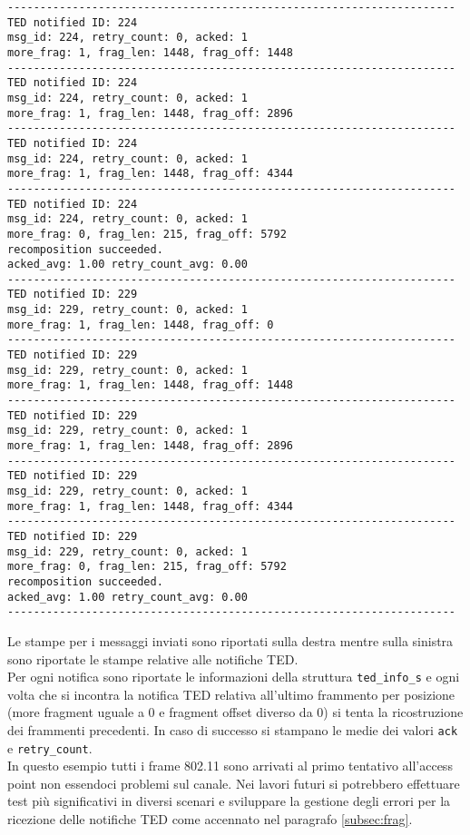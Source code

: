 \documentclass[a4paper,10pt]{article}
\begin{document}
\begin{lstlisting}
---------------------------------------------------------------------
TED notified ID: 224 
msg_id: 224, retry_count: 0, acked: 1
more_frag: 1, frag_len: 1448, frag_off: 1448
---------------------------------------------------------------------
TED notified ID: 224 
msg_id: 224, retry_count: 0, acked: 1
more_frag: 1, frag_len: 1448, frag_off: 2896
---------------------------------------------------------------------
TED notified ID: 224 
msg_id: 224, retry_count: 0, acked: 1
more_frag: 1, frag_len: 1448, frag_off: 4344
---------------------------------------------------------------------
TED notified ID: 224 
msg_id: 224, retry_count: 0, acked: 1
more_frag: 0, frag_len: 215, frag_off: 5792
recomposition succeeded.
acked_avg: 1.00 retry_count_avg: 0.00
---------------------------------------------------------------------
TED notified ID: 229 
msg_id: 229, retry_count: 0, acked: 1
more_frag: 1, frag_len: 1448, frag_off: 0
---------------------------------------------------------------------
TED notified ID: 229 
msg_id: 229, retry_count: 0, acked: 1
more_frag: 1, frag_len: 1448, frag_off: 1448
---------------------------------------------------------------------
TED notified ID: 229 
msg_id: 229, retry_count: 0, acked: 1
more_frag: 1, frag_len: 1448, frag_off: 2896
---------------------------------------------------------------------
TED notified ID: 229 
msg_id: 229, retry_count: 0, acked: 1
more_frag: 1, frag_len: 1448, frag_off: 4344
---------------------------------------------------------------------
TED notified ID: 229 
msg_id: 229, retry_count: 0, acked: 1
more_frag: 0, frag_len: 215, frag_off: 5792
recomposition succeeded.
acked_avg: 1.00 retry_count_avg: 0.00
---------------------------------------------------------------------

\end{lstlisting}

Le stampe per i messaggi inviati sono riportati sulla destra mentre
sulla sinistra sono riportate le stampe relative alle notifiche TED.\\

Per ogni notifica sono riportate le informazioni della struttura
\texttt{ted\_info\_s} e ogni volta che si incontra la notifica TED
relativa all'ultimo frammento per posizione (more fragment uguale a 0 e
fragment offset diverso da 0) si tenta la ricostruzione dei frammenti
precedenti. In caso di successo si stampano le medie dei valori
\texttt{ack} e \texttt{retry\_count}.\\

In questo esempio tutti i frame
802.11 sono arrivati al primo tentativo 
all'access point non essendoci problemi sul canale.
Nei lavori futuri si potrebbero effettuare test più significativi in
diversi scenari e sviluppare la gestione degli errori per la ricezione
delle notifiche TED come accennato nel paragrafo \ref{subsec:frag}.\\

{}

\end{document}
